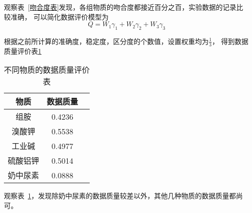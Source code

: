     观察表~\ref{吻合度表}发现，各组物质的吻合度都接近百分之百，实验数据的记录比较准确，
    可以简化数据评价模型为
    $$Q=W_1\gamma_1+W_2\gamma_2+W_3\gamma_3$$
    
    根据之前所计算的准确度，稳定度，区分度的个数值，设置权重均为$\frac{1}{3}$， 得到数据质量评价表\ref{数据质量表}
    
    \begin{table}[H]
      \centering
      \caption{不同物质的数据质量评价表}
      \label{数据质量表}
      \begin{tabular}{@{}ccc@{}}
      \toprule
      物质 & 数据质量  \\ \midrule
      组胺 & 0.4236  \\
      溴酸钾 & 0.5538  \\
      工业碱 & 0.4977  \\
      硫酸铝钾 & 0.5014 \\
      奶中尿素 & 0.0888 \\ \bottomrule
      \end{tabular}
    \end{table}
    
    
    观察表~\ref{数据质量表}，发现除奶中尿素的数据质量较差以外，其他几种物质的数据质量都尚可。
    
    
    